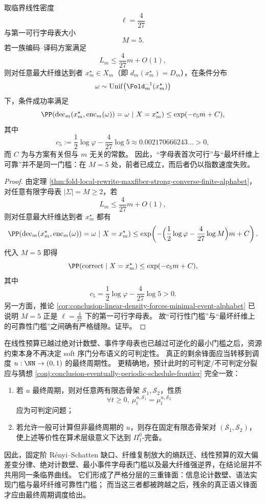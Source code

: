 \begin{theorem}[第一可行字母表并不消除最大纤维上的指数失败]\label{thm:conclusion-first-feasible-alphabet-still-fails-on-maxfiber}
取临界线性密度
\[
\ell=\frac{4}{27}
\]
与第一可行字母表大小
\[
M=5.
\]
若一族编码--译码方案满足
\[
L_m\le \frac{4}{27}m+O(1),
\]
则对任意最大纤维达到者 \(x_m^\star\in X_m\)（即 \(d_m(x_m^\star)=D_m\)），在条件分布
\[
\omega\sim \mathrm{Unif}\bigl(\Fold_m^{-1}(x_m^\star)\bigr)
\]
下，条件成功率满足
\[
\PP\!\left(
\mathrm{dec}_m(x_m^\star,\mathrm{enc}_m(\omega))=\omega
\ \middle|\ X=x_m^\star
\right)
\le
\exp(-c_5m+C),
\]
其中
\[
c_5:=\frac12\log\varphi-\frac{4}{27}\log 5
\approx 0.002170666243\ldots>0,
\]
而 \(C\) 为与方案有关但与 \(m\) 无关的常数。
因此，“字母表首次可行”与“最坏纤维上可靠”并不是同一门槛：在 \(M=5\) 处，前者已成立，而后者仍以指数速度失败。
\end{theorem}
\begin{proof}
由定理 \ref{thm:fold-local-rewrite-maxfiber-strong-converse-finite-alphabet}，对任意有限字母表 \(|\Sigma|=M\ge 2\)，若
\[
L_m\le \frac{4}{27}m+O(1),
\]
则对任意最大纤维达到者 \(x_m^\star\) 都有
\[
\PP\!\left(
\mathrm{dec}_m(x_m^\star,\mathrm{enc}_m(\omega))=\omega
\ \middle|\ X=x_m^\star
\right)
\le
\exp\!\left(-\Bigl(\frac12\log\varphi-\frac{4}{27}\log M\Bigr)m+C\right).
\]
代入 \(M=5\) 即得
\[
\PP(\mathrm{correct}\mid X=x_m^\star)\le \exp(-c_5m+C),
\]
其中
\[
c_5=\frac12\log\varphi-\frac{4}{27}\log 5>0.
\]
另一方面，推论 \ref{cor:conclusion-linear-density-forces-minimal-event-alphabet} 已说明 \(M=5\) 正是 \(\ell=\frac4{27}\) 下的第一可行字母表。
故“可行性门槛”与“最坏纤维上的可靠性门槛”之间确有严格缝隙。证毕。
\end{proof}

\begin{conjecture}\label{conj:conclusion-budget-alphabet-crossed-schedule-frontier}
在线性预算已越过绝对计数壁、事件字母表也已越过可逆化的最小门槛之后，资源约束本身不再决定 soft 序门分布语义的可判定性。
真正的剩余锋面应当转移到调度 \(u:\NN\to(0,1)\) 的最终周期性。
更精确地，预计此时的可判定/不可判定分裂应与猜想 \ref{conj:conclusion-eventually-periodic-schedule-frontier} 完全一致：
\begin{enumerate}
\normalfont
  \item 若 \(u\) 最终周期，则对任意两有限态骨架 \(\mathcal S_1,\mathcal S_2\)，性质
  \[
  \forall t\ge 0,\ \mu_t^{u,\mathcal S_1}=\mu_t^{u,\mathcal S_2}
  \]
  应为可判定问题；
  \item 若允许一般可计算但非最终周期的 \(u\)，则存在固定有限态骨架对 \((\mathcal S_1,\mathcal S_2)\)，使上述等价性在算术层级意义下达到 \(\Pi^0_1\)-完备。
\end{enumerate}
\end{conjecture}

因此，固定阶 Rényi--Schatten 缺口、纤维复制放大的熵跃迁、线性预算的双大偏差变分律、绝对计数壁、最小事件字母表门槛以及最大纤维强逆界，在结论层并不共用同一条临界曲线。
它们形成了严格分层的三重锋面：信息论计数壁、语法实现门槛与最坏纤维可靠性门槛；
而当这三者都被跨越之后，残余的真正语义锋面才应由最终周期调度给出。
